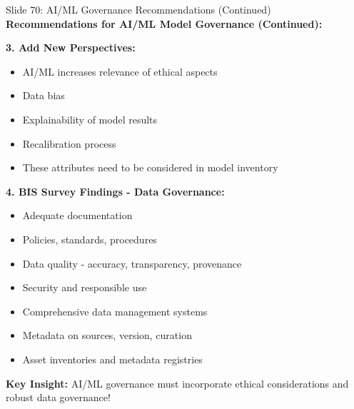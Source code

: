 \documentclass[8pt]{beamer}
\begin{document}
	
	\begin{frame}{Slide 70: AI/ML Governance Recommendations (Continued)}
		\fontsize{6.5}{7.5}\selectfont
		\textbf{Recommendations for AI/ML Model Governance (Continued):}
		
		\vspace{0.1cm}
		\textbf{3. Add New Perspectives:}
		\begin{itemize}
			\item AI/ML increases relevance of ethical aspects
			\item Data bias
			\item Explainability of model results
			\item Recalibration process
			\item These attributes need to be considered in model inventory
		\end{itemize}
		
		\vspace{0.1cm}
		\textbf{4. BIS Survey Findings - Data Governance:}
		\begin{itemize}
			\item Adequate documentation
			\item Policies, standards, procedures
			\item Data quality - accuracy, transparency, provenance
			\item Security and responsible use
			\item Comprehensive data management systems
			\item Metadata on sources, version, curation
			\item Asset inventories and metadata registries
		\end{itemize}
		
		\textcolor{myblue}{\textbf{Key Insight:}} AI/ML governance must \textcolor{myblue}{incorporate ethical considerations and robust data governance}!
	\end{frame}
	
\end{document}
